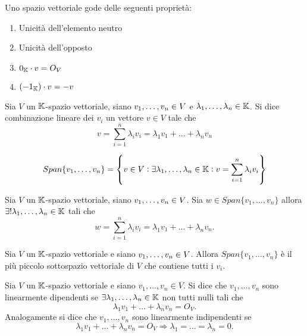 \begin{propriety} Uno spazio vettoriale gode delle seguenti proprietà:
	\begin{enumerate}
		\item Unicità dell'elemento neutro
		\item Unicità dell'opposto
		\item $ 0_{\mathbb{K}} \cdot v = O_V $
		\item $ (-1_{\mathbb{K}}) \cdot v = -v $
	\end{enumerate}
\end{propriety}

\begin{definition}
	Sia $ V $ un $ \mathbb{K} $-spazio vettoriale, siano $ v_1, \ldots , v_n \in \nobreak V $ e $ \lambda_1, \ldots , \lambda_n \in \mathbb{K} $. 
	Si dice combinazione lineare dei $ v_i $ un vettore $ v \in V $ tale che 
	\[v = \sum_{i=1}^{n} \lambda_i v_i = \lambda_1 v_1 + \ldots + \lambda_n v_n \]
\end{definition}


\begin{definition}[Span]
	\[Span\{v_1, \ldots , v_n\} = \left\{ v \in V: \exists \lambda_1, \ldots , \lambda_n \in \mathbb{K}: v = \sum_{i=1}^{n} \lambda_i v_i \right\}\]
\end{definition}

\begin{prop}
	Sia $ V $ un $ \mathbb{K} $-spazio vettoriale, siano $ v_1, \ldots , v_n \in \nobreak V $. Sia 
	$ w \in Span\{v_1, \ldots , v_n\}$ allora $\exists !  \lambda_1, \ldots , \lambda_n \in \mathbb{K}$ tali che
	\[w = \sum_{i=1}^{n} \lambda_i v_i = \lambda_1 v_1 + \ldots + \lambda_n v_n. \]  
\end{prop}

\begin{thm}
	Sia $ V $ un $ \mathbb{K} $-spazio vettoriale e siano $ v_1, \ldots , v_n \in \nolinebreak V $. 
	Allora $ Span\{v_1, \ldots , v_n\} $ è il più piccolo sottospazio vettoriale di $ V $ 
	che contiene tutti i $ v_i $.
\end{thm}

\begin{definition} 
	Sia $ V $ un $ \mathbb{K} $-spazio vettoriale e siano $ v_1, \ldots , v_n \in V $. Si dice che $ v_1, \ldots, v_n $ sono linearmente dipendenti se $ \exists \lambda_1, \ldots , \lambda_n \in \mathbb{K} $ non tutti nulli tali che \[\lambda_1 v_1 + \ldots + \lambda_n v_n = O_V.\] Analogamente si dice che $ v_1, \ldots, v_n $ sono linearmente indipendenti se \[\lambda_1 v_1 + \ldots + \lambda_n v_n = O_V \Rightarrow \lambda_1 = \ldots = \lambda_n = 0.\]	
\end{definition}

